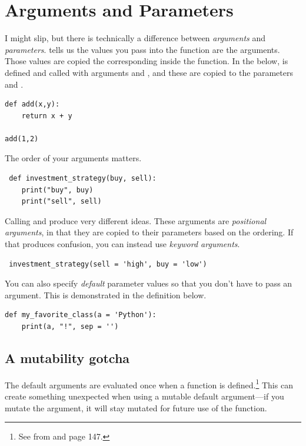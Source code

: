  
\section{Arguments and Parameters}
 
I might slip, but there is technically a difference between \emph{arguments} and \emph{parameters}. \cite{lubanovic2019introducing} tells us the values you pass into the function are the arguments. Those values are copied the corresponding  inside the function. In the below,  is defined and called with arguments  and , and these are copied to the parameters  and .

\begin{lstlisting}
def add(x,y):
    return x + y
    
add(1,2)
\end{lstlisting}
 
 
 The order of your arguments matters. 
 
 \begin{lstlisting}
 def investment_strategy(buy, sell):
    print("buy", buy)
    print("sell", sell)
 \end{lstlisting}
 
 Calling  and  produce very different ideas. These arguments are \emph{positional arguments}, in that they are copied to their parameters based on the ordering. If that produces confusion, you can instead use \emph{keyword arguments}. 
 
 \begin{lstlisting}
 investment_strategy(sell = 'high', buy = 'low')
 \end{lstlisting}
 
 You can also specify \emph{default} parameter values so that you don't have to pass an argument. This is demonstrated in the definition below.
 
\begin{lstlisting}
def my_favorite_class(a = 'Python'):
    print(a, "!", sep = '')
\end{lstlisting}
 
 
\subsection{A mutability gotcha}

The default arguments are evaluated once when a function is defined.\footnote{See  from \cite{reitz2016hitchhiker} and \cite{lubanovic2019introducing} page 147.} This can create something unexpected when using a mutable default argument---if you mutate the argument, it will stay mutated for future use of the function. 



